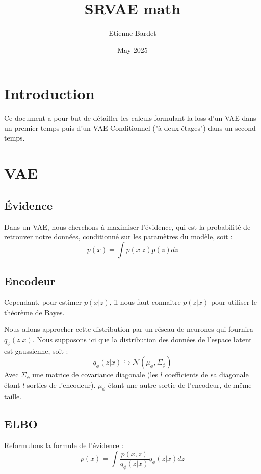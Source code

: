 \documentclass{article}
\title{SRVAE math}
\author{Etienne Bardet}
\date{May 2025}
\begin{document}
\maketitle

\section{Introduction}
Ce document a pour but de détailler les calculs formulant la loss d'un VAE dans un premier temps puis d'un VAE Conditionnel ("à deux étages") dans un second temps.

\section{VAE}
\subsection{Évidence}
Dans un VAE, nous cherchons à maximiser l'évidence, qui est la probabilité de retrouver notre données, conditionné sur les paramètres du modèle, soit :
\begin{equation*}
    p(x) = \int p(x|z) p(z)dz
\end{equation*}

\subsection{Encodeur}

Cependant, pour estimer $p(x|z)$, il nous faut connaitre $p(z|x)$ pour utiliser le théorème de Bayes.

Nous allons approcher cette distribution par un réseau de neurones qui fournira $q_{\phi}(z|x)$.
Nous supposons ici que la distribution des données de l'espace latent est gaussienne, soit :
\begin{equation*}
    q_{\phi}(z|x) \hookrightarrow \mathcal{N}(\mu_{\phi}, \Sigma_{\phi})
\end{equation*}
Avec $\Sigma_\phi$ une matrice de covariance diagonale (les $l$ coefficients de sa diagonale étant $l$ sorties de l'encodeur). $\mu_\phi$ étant une autre sortie de l'encodeur, de même taille.

\subsection{ELBO}

Reformulons la formule de l'évidence :
\begin{equation*}
    p(x) = \int \frac{p(x,z)}{q_\phi(z|x)}q_\phi(z|x)dz
\end{equation*}
\end{document}
